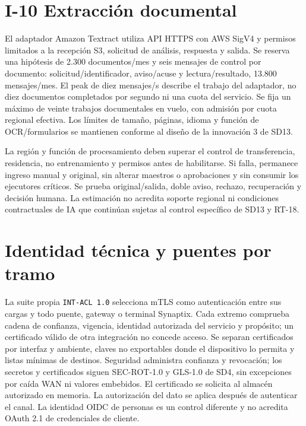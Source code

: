\section*{I-10 Extracción documental}
El adaptador Amazon Textract utiliza API HTTPS con AWS SigV4 y permisos limitados a la recepción S3, solicitud de análisis, respuesta y salida. Se reserva una hipótesis de 2.300 documentos/mes y seis mensajes de control por documento: solicitud/identificador, aviso/acuse y lectura/resultado, 13.800 mensajes/mes. El peak de diez mensajes/s describe el trabajo del adaptador, no diez documentos completados por segundo ni una cuota del servicio. Se fija un máximo de veinte trabajos documentales en vuelo, con admisión por cuota regional efectiva. Los límites de tamaño, páginas, idioma y función de OCR/formularios se mantienen conforme al diseño de la innovación 3 de SD13.

La región y función de procesamiento deben superar el control de transferencia, residencia, no entrenamiento y permisos antes de habilitarse. Si falla, permanece ingreso manual y original, sin alterar maestros o aprobaciones y sin consumir los ejecutores críticos. Se prueba original/salida, doble aviso, rechazo, recuperación y decisión humana. La estimación no acredita soporte regional ni condiciones contractuales de IA que continúan sujetas al control específico de SD13 y RT-18.

\section*{Identidad técnica y puentes por tramo}
\label{sec:a42-identidad}

La suite propia \texttt{INT-ACL 1.0} selecciona mTLS como autenticación entre sus cargas y todo puente, gateway o terminal Synaptix. Cada extremo comprueba cadena de confianza, vigencia, identidad autorizada del servicio y propósito; un certificado válido de otra integración no concede acceso. Se separan certificados por interfaz y ambiente, claves no exportables donde el dispositivo lo permita y listas mínimas de destinos. Seguridad administra confianza y revocación; los secretos y certificados siguen SEC-ROT-1.0 y GLS-1.0 de SD4, sin excepciones por caída WAN ni valores embebidos. El certificado se solicita al almacén autorizado en memoria. La autorización del dato se aplica después de autenticar el canal. La identidad OIDC de personas es un control diferente y no acredita OAuth 2.1 de credenciales de cliente.

